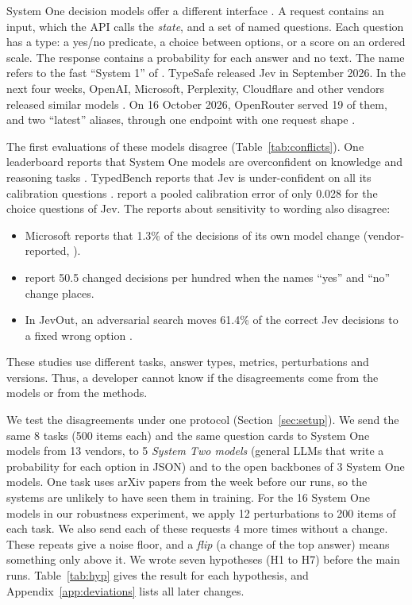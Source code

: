 \documentclass[11pt]{article}
\begin{document}
System One decision models offer a different interface \citep{typesafe2026introducing,typesafe2026docs}. A request contains an input, which the API calls the \emph{state}, and a set of named questions. Each question has a type: a yes/no predicate, a choice between options, or a score on an ordered scale. The response contains a probability for each answer and no text. The name refers to the fast ``System 1'' of \citet{kahneman2011thinking}. TypeSafe released Jev in September 2026. In the next four weeks, OpenAI, Microsoft, Perplexity, Cloudflare and other vendors released similar models \citep{openai2026decisions,microsoft2026decision1,perplexity2026decider,cloudflare2026clef}. On 16 October 2026, OpenRouter served 19 of them, and two ``latest'' aliases, through one endpoint with one request shape \citep{openrouter2026decisions}.

The first evaluations of these models disagree (Table~\ref{tab:conflicts}). One leaderboard reports that System One models are overconfident on knowledge and reasoning tasks \citep{artificialanalysis2026decision}. TypedBench reports that Jev is under-confident on all its calibration questions \citep{sharma2026typedbench}. \citet{deusser2026evaluating} report a pooled calibration error of only 0.028 for the choice questions of Jev. The reports about sensitivity to wording also disagree:
\begin{itemize}
\setlength\itemsep{0pt}
\item Microsoft reports that 1.3\% of the decisions of its own model change (vendor-reported, \citealp{microsoft2026decision1}).
\item \citet{rafe2026benchmarking} report 50.5 changed decisions per hundred when the names ``yes'' and ``no'' change places.
\item In JevOut, an adversarial search moves 61.4\% of the correct Jev decisions to a fixed wrong option \citep{xu2026jevout}.
\end{itemize}
These studies use different tasks, answer types, metrics, perturbations and versions. Thus, a developer cannot know if the disagreements come from the models or from the methods.

We test the disagreements under one protocol (Section~\ref{sec:setup}). We send the same 8 tasks (500 items each) and the same question cards to \nSystemOne{} System One models from 13 vendors, to 5 \emph{System Two models} (general LLMs that write a probability for each option in JSON) and to the open backbones of 3 System One models. One task uses arXiv papers from the week before our runs, so the systems are unlikely to have seen them in training. For the 16 System One models in our robustness experiment, we apply 12 perturbations to 200 items of each task. We also send each of these requests 4 more times without a change. These repeats give a noise floor, and a \emph{flip} (a change of the top answer) means something only above it. We wrote seven hypotheses (H1 to H7) before the main runs. Table~\ref{tab:hyp} gives the result for each hypothesis, and Appendix~\ref{app:deviations} lists all later changes.
\end{document}
